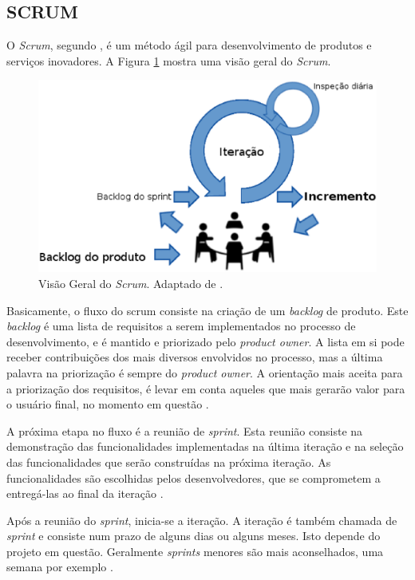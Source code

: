 \subsection{SCRUM}
\label{scrum_sec}

O \emph{Scrum}, segundo , é um método ágil para desenvolvimento de produtos e serviços inovadores. 
A Figura \ref{scrum_geral} mostra uma visão geral do \emph{Scrum}.
\begin{figure}[ht]
	\centering
	\includegraphics[width=15cm]{figuras/scrum_geral.eps}
	\caption{Visão Geral do \emph{Scrum}. Adaptado de \cite{Schwaber2004}.}
	\label{scrum_geral}
\end{figure}

Basicamente, o fluxo do scrum consiste na criação de um \emph{backlog} de produto. 
Este \emph{backlog} é uma lista de requisitos a serem implementados no processo de desenvolvimento, e é mantido e priorizado pelo \emph{product owner}. 
A lista em si pode receber contribuições dos mais diversos envolvidos no processo, mas a última palavra na priorização é sempre do \emph{product owner}.
A orientação mais aceita para a priorização dos requisitos, é levar em conta aqueles que mais gerarão valor para o usuário final, no momento em questão \cite{Schwaber2001}.

A próxima etapa no fluxo é a reunião de \emph{sprint}. 
Esta reunião consiste na demonstração das funcionalidades implementadas na última iteração e na seleção das funcionalidades que serão construídas na próxima iteração.
As funcionalidades são escolhidas pelos desenvolvedores, que se comprometem a entregá-las ao final da iteração \cite{Schwaber2004}.

Após a reunião do \emph{sprint}, inicia-se a iteração. A iteração é também chamada de \emph{sprint} e consiste num prazo de alguns dias ou alguns meses. 
Isto depende do projeto em questão. Geralmente \emph{sprints} menores são mais aconselhados, uma semana por exemplo \cite{Schwaber2004}.

